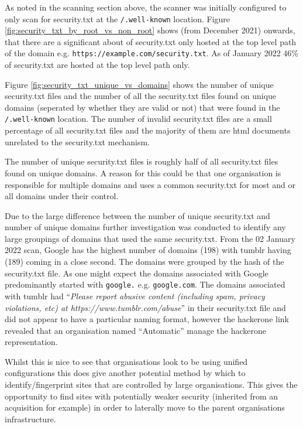 \documentclass{mscreport}
\begin{document}
\noindent
As noted in the scanning section above, the scanner was initially configured to only scan for security.txt at the \texttt{/.well-known} location. Figure \ref{fig:security_txt_by_root_vs_non_root} shows (from December 2021) onwards, that there are a significant about of security.txt only hosted at the top level path of the domain e.g. \newline \texttt{https://example.com/security.txt}. As of January 2022 46\% of security.txt are hosted at the top level path only.

\vspace{0.3cm} \noindent
Figure \ref{fig:security_txt_unique_vs_domains} shows the number of unique security.txt files and the number of all the security.txt files found on unique domains (seperated by whether they are valid or not) that were found in the \texttt{/.well-known} location. The number of invalid security.txt files are a small percentage of all security.txt files and the majority of them are html documents unrelated to the security.txt mechanism.

\vspace{0.3cm} \noindent
The number of unique security.txt files is roughly half of all security.txt files found on unique domains. A reason for this could be that one organisation is responsible for multiple domains and uses a common security.txt for most and or all domains under their control.

\vspace{0.3cm} \noindent
Due to the large difference between the number of unique security.txt and number of unique domains further investigation was conducted to identify any large groupings of domains that used the same security.txt. From the 02 January 2022 scan, Google has the highest number of domains (198) with tumblr having (189) coming in a close second. The domains were grouped by the hash of the security.txt file. As one might expect the domains associated with Google predominantly started with \texttt{google.} e.g. \texttt{google.com}. The domains associated with tumblr had ``\textit{Please report abusive content (including spam, privacy violations, etc) at https://www.tumblr.com/abuse}'' in their security.txt file and did not appear to have a particular naming format, however the hackerone link revealed that an organisation named ``Automatic'' manage the hackerone representation.

\vspace{0.3cm} \noindent
Whilst this is nice to see that organisations look to be using unified configurations this does give another potential method by which to identify/fingerprint sites that are controlled by large organisations. This gives the opportunity to find sites with potentially weaker security (inherited from an acquisition for example) in order to laterally move to the parent organisations infrastructure.
\end{document}
